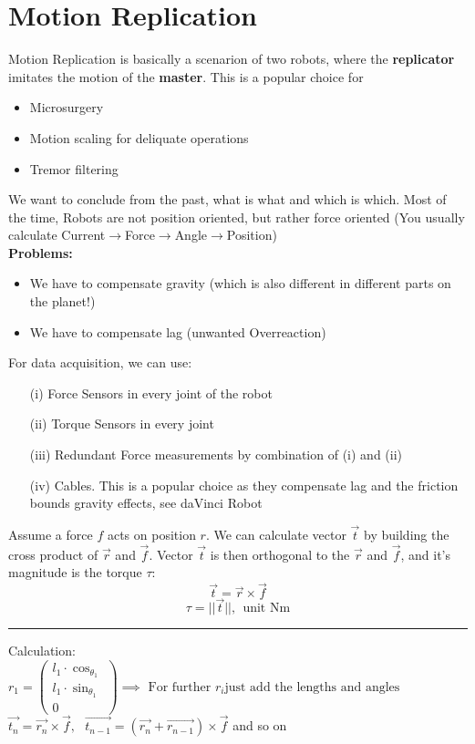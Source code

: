 \documentclass{exerciseBlue}
\begin{document}
\section{Motion Replication}\label{sec:motion}
Motion Replication is basically a scenarion of two robots, where the \textbf{replicator} imitates the motion of the \textbf{master}. This is a popular choice for\\\begin{itemize}
	\item Microsurgery
	\item Motion scaling for deliquate operations
	\item Tremor filtering
\end{itemize}
We want to conclude from the past, what is what and which is which. Most of the time, Robots are not position oriented, but rather force oriented (You usually calculate Current$\rightarrow$Force$\rightarrow$Angle$\rightarrow$Position)\\
\textbf{Problems:}\begin{itemize}
	\item We have to compensate gravity (which is also different in different parts on the planet!)
	\item We have to compensate lag (unwanted Overreaction)
\end{itemize}
For data acquisition, we can use:
\begin{itemize}
	\item[(i)] Force Sensors in every joint of the robot
	\item[(ii)] Torque Sensors in every joint
	\item[(iii)] Redundant Force measurements by combination of (i) and (ii)
	\item[(iv)] Cables. This is a popular choice as they compensate lag and the friction bounds gravity effects, see daVinci Robot
\end{itemize}
Assume a force $f$ acts on position $r$. We can calculate vector $\vec{t}$ by building the cross product of $\vec{r}$ and $\vec{f}$. Vector $\vec{t}$ is then orthogonal to the $\vec{r}$ and $\vec{f}$, and it's magnitude is the torque $\tau$: 
$$\vec{t} = \vec{r} \times \vec{f}$$
$$\tau = ||\vec{t}||, \ \ \text{unit Nm}$$
\noindent\rule{\textwidth}{0.3pt}
Calculation:
$r_1 = \begin{pmatrix}
l_1\cdot \cos_{\theta_1}\\l_1\cdot\sin_{\theta_1}\\0
\end{pmatrix} \implies \text{ For further } r_i \text{just add the lengths and angles}$
$\vec{t_n} = \vec{r_n} \times \vec{f}, \ \ \ \vec{t_{n-1}} = (\vec{r_n} + \vec{r_{n-1}}) \times \vec{f}$ and so on
\end{document}
